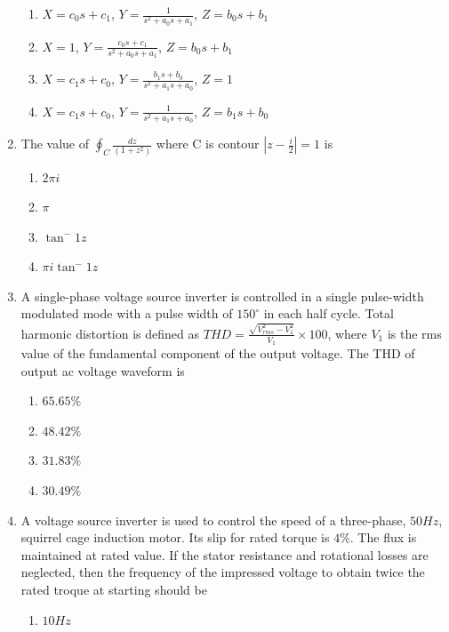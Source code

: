 \documentclass[journal,12pt,twocolumn]{IEEEtran}
\theoremstyle{remark}
\begin{document}
\begin{enumerate}
\begin{figure}[h!]
\end{figure}
\begin{enumerate}
    \item $X=c_0s+c_1$, $Y=\frac{1}{s^2+a_0s+a_1}$, $Z=b_0s+b_1$
    \item $X=1$, $Y=\frac{c_0s+c_1}{s^2+a_0s+a_1}$, $Z=b_0s+b_1$
    \item $X=c_1s+c_0$, $Y=\frac{b_1s+b_0}{s^2+a_1s+a_0}$, $Z=1$
    \item $X=c_1s+c_0$, $Y=\frac{1}{s^2+a_1s+a_0}$, $Z=b_1s+b_0$
\end{enumerate}
\item The value of $\oint_{C}\frac{dz}{(1+z^{2})}$ where C is contour $|z-\frac{i}{2}|=1$ is 
\begin{multicols}{2}
\begin{enumerate}
    \item $2\pi i$
    \item $\pi$
    \item $\tan^-{1}{z}$
    \item $\pi i \tan^-{1}{z}$ 
\end{enumerate}
\end{multicols}
\item A single-phase voltage source inverter is controlled in a single pulse-width modulated mode with a pulse width of $150^\circ$ in each half cycle. Total harmonic distortion is defined as $THD=\frac{\sqrt{V_{rms}^2-V_1^2}}{V_1}\times 100$, where $V_1$ is the rms value of the fundamental component of the output voltage. The THD of output ac voltage waveform is 
\begin{multicols}{2}
\begin{enumerate}
    \item $65.65\%$
    \item $48.42\%$
    \item $31.83\%$
    \item $30.49\%$
\end{enumerate}    
\end{multicols}
\item A voltage source inverter is used to control the speed of a three-phase, $50Hz$, squirrel cage induction motor. Its slip for rated torque is $4\%$. The flux is maintained at rated value. If the stator resistance and rotational losses are neglected, then the frequency of the impressed voltage to obtain twice the rated troque at starting should be
\begin{multicols}{2}
\begin{enumerate}
    \item $10Hz$

\end{enumerate}
\end{multicols}
\end{enumerate}
\end{document}
